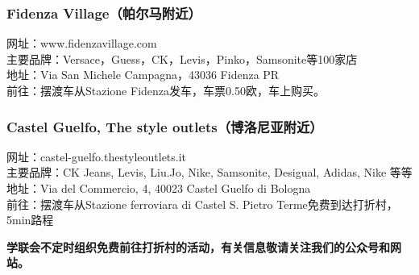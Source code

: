 \begin{multicols}{2}
\subsubsection{Fidenza Village（帕尔马附近）}
\noindent 网址：www.fidenzavillage.com\\
主要品牌：Versace，Guess，CK，Levis，Pinko，Samsonite等100家店\\
地址：Via San Michele Campagna，43036 Fidenza PR\\
前往：摆渡车从Stazione Fidenza发车，车票0.50欧，车上购买。

\subsubsection{Castel Guelfo, The style outlets（博洛尼亚附近）}
\noindent 网址：castel-guelfo.thestyleoutlets.it\\
主要品牌：CK Jeans, Levis, Liu.Jo, Nike, Samsonite, Desigual, Adidas, Nike 等等\\
地址：Via del Commercio, 4, 40023 Castel Guelfo di Bologna\\
前往：摆渡车从Stazione ferroviara di Castel S. Pietro Terme免费到达打折村，5min路程


\end{multicols}


\textbf{学联会不定时组织免费前往打折村的活动，有关信息敬请关注我们的公众号和网站。}

